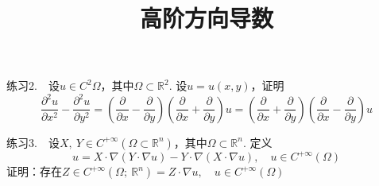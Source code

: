 \documentclass{article}
\title{高阶方向导数}
\author{}
\date{}
\begin{document}
\maketitle

练习2.\ \ 设\(u \in C^{2}\Omega\)，其中\(\Omega \subset \mathbb{R}^{2}\). 设\(u = u(x,y)\)，证明
\begin{equation*}
    \frac{\partial^{2}u}{\partial x^{2}} -\frac{\partial^{2}u}{\partial y^{2}} = \left( \frac{\partial}{\partial x} -\frac{\partial}{\partial y} \right)\left( \frac{\partial}{\partial x} +\frac{\partial}{\partial y} \right) u =\left( \frac{\partial}{\partial x} +\frac{\partial}{\partial y} \right)\left( \frac{\partial}{\partial x} -\frac{\partial}{\partial y} \right) u
\end{equation*}

\vspace{10pt}

练习3.\ \ 设\(X,\ Y \in C^{ + \infty }(\Omega \subset \mathbb{R}^{n})，\)其中\(\Omega \subset \mathbb{R}^n\). 定义
\begin{equation*}
    [ X,\ Y] u = X \cdot \nabla (Y \cdot \nabla u) - Y \cdot \nabla (X \cdot \nabla u),\quad u \in C^{ + \infty }(\Omega )
\end{equation*}
证明：存在\(Z \in C^{ + \infty }(\Omega ;\ \mathbb{R}^n) = Z \cdot \nabla u,\quad u \in C^{ + \infty }(\Omega )\)
\end{document}
